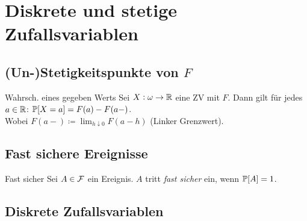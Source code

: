 \section{Diskrete und stetige Zufallsvariablen}%
\label{sec:diskrete_und_stetige_zufallsvariablen}

\subsection{(Un-)Stetigkeitspunkte von $F$}%
\label{sub:_un_stetigkeitspunkte_von_f}

\begin{tprop}{Wahrsch. eines gegeben Werts}
	Sei $X : \omega \rightarrow \mathbb{R}$ eine ZV mit $F$. Dann gilt für jedes $a \in \mathbb{R}$: $\mathbb{P} [X = a] = F(a) - F(a-)$.\\
	Wobei $F (a-) \coloneqq \lim_{h \downarrow 0} F( a - h )$ (Linker Grenzwert).
\end{tprop}


\subsection{Fast sichere Ereignisse}%
\label{sub:fast_sichere_ereignisse}

\begin{definition}{Fast sicher}
	Sei $A \in \mathcal{F}$ ein Ereignis. $A$ tritt \emph{fast sicher} ein, wenn $\mathbb{P} [A] = 1$.
\end{definition}



\subsection{Diskrete Zufallsvariablen}%
\label{sub:diskrete_zufallsvariablen}

